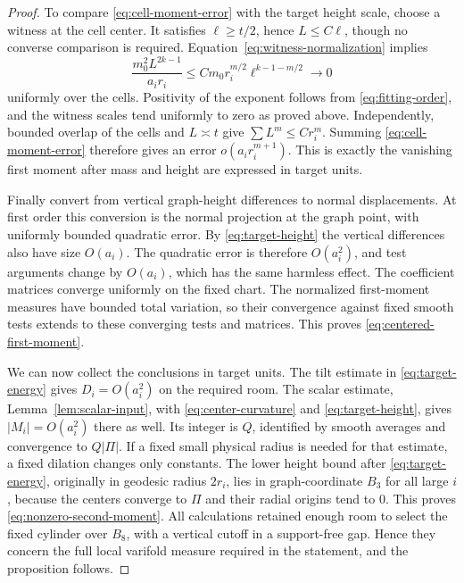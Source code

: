 \begin{proof}
To compare \eqref{eq:cell-moment-error} with the target height scale,
choose a witness at the cell center. It satisfies $\ell\ge t/2$,
hence $L\le C\ell$, though no converse comparison is required.
Equation~\eqref{eq:witness-normalization} implies
\[
 \frac{m_0^2L^{2k-1}}{a_i r_i}
    \le Cm_0r_i^{m/2}\ell^{k-1-m/2}\longrightarrow0
\]
uniformly over the cells. Positivity of the exponent follows from
\eqref{eq:fitting-order}, and the witness scales tend uniformly to
zero as proved above. Independently, bounded overlap of the cells
and $L\asymp t$ give $\sum L^m\le Cr_i^m$. Summing
\eqref{eq:cell-moment-error} therefore gives an error
$o(a_i r_i^{m+1})$. This is exactly the vanishing first moment after
mass and height are expressed in target units.

Finally convert from vertical graph-height differences to normal
displacements. At first order this conversion is the normal projection
at the graph point, with uniformly bounded quadratic error. By
\eqref{eq:target-height} the vertical differences also have size
$O(a_i)$. The quadratic error is therefore $O(a_i^2)$, and test
arguments change by $O(a_i)$, which has the same harmless effect.
The coefficient matrices converge uniformly on the fixed chart.
The normalized first-moment measures have bounded total variation,
so their convergence against fixed smooth tests extends to these
converging tests and matrices. This proves
\eqref{eq:centered-first-moment}.

We can now collect the conclusions in target units. The tilt estimate
in \eqref{eq:target-energy} gives $D_i=O(a_i^2)$ on the required
room. The scalar estimate, Lemma~\ref{lem:scalar-input}, with
\eqref{eq:center-curvature} and \eqref{eq:target-height}, gives
$|M_i|=O(a_i^2)$ there as well. Its integer is $Q$, identified by
smooth averages and convergence to $Q|\Pi|$. If a fixed small physical
radius is needed for that estimate, a fixed dilation changes only
constants. The lower height bound after
\eqref{eq:target-energy}, originally in geodesic radius $2r_i$,
lies in graph-coordinate $B_3$ for all large $i$, because the centers
converge to $\Pi$ and their radial origins tend to $0$.
This proves \eqref{eq:nonzero-second-moment}. All calculations retained
enough room to select the fixed cylinder over $B_8$, with a vertical
cutoff in a support-free gap. Hence they concern the full local
varifold measure required in the statement, and the proposition follows.
\end{proof}
